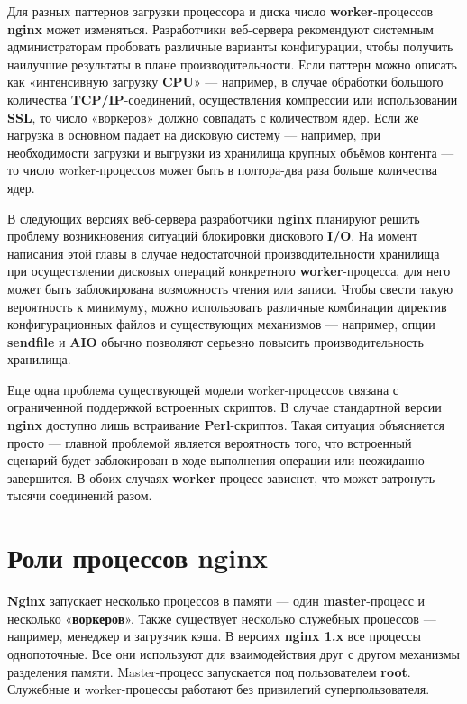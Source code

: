 \documentclass[14pt, a4paper]{article}
\begin{document}
Для разных паттернов загрузки процессора и диска число \textbf{worker}-процессов \textbf{nginx} может изменяться.
Разработчики веб-сервера рекомендуют системным администраторам пробовать различные варианты конфигурации, 
чтобы получить наилучшие результаты в плане производительности. Если паттерн можно описать как 
«интенсивную загрузку \textbf{CPU}» — например, в случае обработки большого количества \textbf{TCP/IP}-соединений, 
осуществления компрессии или использовании \textbf{SSL}, то число «воркеров» должно совпадать с количеством 
ядер. Если же нагрузка в основном падает на дисковую систему — например, при необходимости загрузки 
и выгрузки из хранилища крупных объёмов контента — то число worker-процессов может быть в полтора-два 
раза больше количества ядер.

В следующих версиях веб-сервера разработчики \textbf{nginx} планируют решить проблему возникновения ситуаций 
блокировки дискового \textbf{I/O}. На момент написания этой главы в случае недостаточной производительности 
хранилища при осуществлении дисковых операций конкретного \textbf{worker}-процесса, для него может быть 
заблокирована возможность чтения или записи. Чтобы свести такую вероятность к минимуму, можно 
использовать различные комбинации директив конфигурационных файлов и существующих механизмов — например,
опции \textbf{sendfile} и \textbf{AIO} обычно позволяют серьезно повысить производительность хранилища.

Еще одна проблема существующей модели worker-процессов связана с ограниченной поддержкой встроенных 
скриптов. В случае стандартной версии \textbf{nginx} доступно лишь встраивание \textbf{Perl}-скриптов. Такая ситуация 
объясняется просто — главной проблемой является вероятность того, что встроенный сценарий будет 
заблокирован в ходе выполнения операции или неожиданно завершится. В обоих случаях \textbf{worker}-процесс 
зависнет, что может затронуть тысячи соединений разом.

\section*{Роли процессов nginx}
\textbf{Nginx} запускает несколько процессов в памяти — один \textbf{master}-процесс и несколько «\textbf{воркеров}». 
Также существует несколько служебных процессов — например, менеджер и загрузчик кэша. В версиях 
\textbf{nginx 1.x} все процессы однопоточные. Все они используют для взаимодействия друг с другом механизмы 
разделения памяти. Master-процесс запускается под пользователем \textbf{root}. Служебные и worker-процессы 
работают без привилегий суперпользователя.
\end{document}
